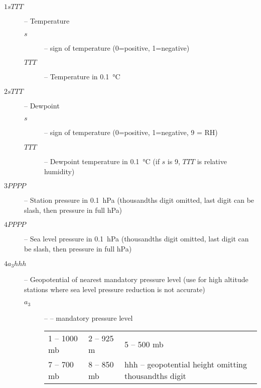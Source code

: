 \documentclass{article}
\newcommand{\gc}{\degreeCelsius}
\begin{document}
\begin{description}
\item[$1sTTT$] -- Temperature
  \begin{description}
  \item[$s$] -- sign of temperature (0=positive, 1=negative)
  \item[$TTT$] -- Temperature in \SI{0.1}{\gc}
  \end{description}
\end{description}
\begin{description}
\item[$2sTTT$] -- Dewpoint
    \begin{description}
    \item[$s$] -- sign of temperature (0=positive, 1=negative, 9 = RH)
    \item[$TTT$] -- Dewpoint temperature in \SI{0.1}{\gc} (if $s$ is 9, $TTT$ is relative humidity)
  \end{description}
\end{description}
\begin{description}
\item[$3PPPP$] -- Station pressure in \SI{0.1}{hPa} (thousandths digit omitted, last digit can be slash, then pressure in full \si{hPa})
\end{description}
\begin{description}
\item[$4PPPP$] -- Sea level pressure in \SI{0.1}{hPa} (thousandths digit omitted, last digit can be slash, then pressure in full \si{hPa})
\end{description}
\begin{description}
\item[$4a_3hhh$] -- Geopotential of nearest mandatory pressure level (use for high altitude stations where sea level pressure reduction is not accurate)
  
  \begin{description}
  \item[$a_3$] -- -- mandatory pressure level
    \begin{tabular}{lll}
      1 -- 1000 mb & 2 -- 925 m &5 -- 500 mb\\
      7 -- 700 mb  & 8 -- 850 mb& hhh -- geopotential height omitting thousandths digit
    \end{tabular}
  \end{description}
\end{description}
\end{document}
